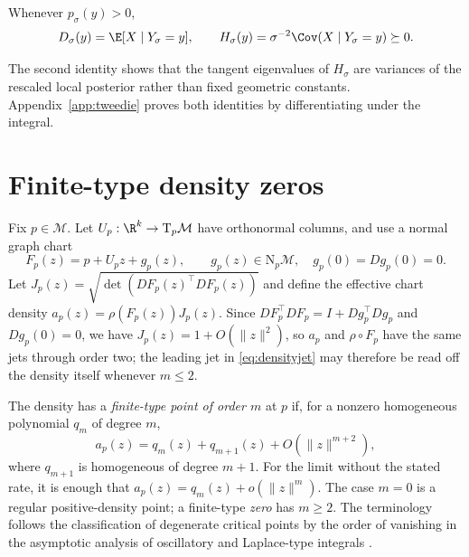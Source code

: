 \documentclass[10pt]{article}
\theoremstyle{c2fup}
\newcommand{\M}{\mathcal{M}}
\newcommand{\T}{\mathrm{T}}
\newcommand{\N}{\mathrm{N}}
\begin{document}
\begin{proposition}
\label{prop:tweedie}
Whenever $p_\sigma(y)>0$,
\begin{equation}
  D_\sigma(y)=\E[X\mid Y_\sigma=y],
  \qquad
  H_\sigma(y)=\sigma^{-2}\Cov(X\mid Y_\sigma=y)\succeq0.
  \label{eq:tweedie}
\end{equation}
\end{proposition}

The second identity shows that the tangent eigenvalues of $H_\sigma$ are variances of the rescaled local posterior rather than fixed geometric constants.  Appendix~\ref{app:tweedie} proves both identities by differentiating under the integral.

\section{Finite-type density zeros}
\label{sec:finite}

Fix $p\in\M$.  Let $U_p:\R^k\to\T_p\M$ have orthonormal columns, and use a normal graph chart
\begin{equation}
  F_p(z)=p+U_pz+g_p(z),\qquad g_p(z)\in\N_p\M,\quad
  g_p(0)=Dg_p(0)=0.
  \label{eq:chart}
\end{equation}
Let $J_p(z)=\sqrt{\det(DF_p(z)^\top DF_p(z))}$ and define the effective chart density $a_p(z)=\rho(F_p(z))J_p(z)$.  Since $DF_p^\top DF_p=I+Dg_p^\top Dg_p$ and $Dg_p(0)=0$, we have $J_p(z)=1+O(\|z\|^2)$, so $a_p$ and $\rho\circ F_p$ have the same jets through order two; the leading jet in \eqref{eq:densityjet} may therefore be read off the density itself whenever $m\le2$.

\begin{definition}
\label{def:finite}
The density has a \emph{finite-type point of order $m$} at $p$ if, for a nonzero homogeneous polynomial $q_m$ of degree $m$,
\begin{equation}
  a_p(z)=q_m(z)+q_{m+1}(z)+O(\|z\|^{m+2}),
  \label{eq:densityjet}
\end{equation}
where $q_{m+1}$ is homogeneous of degree $m+1$.  For the limit without the stated rate, it is enough that $a_p(z)=q_m(z)+o(\|z\|^m)$.
The case $m=0$ is a regular positive-density point; a finite-type \emph{zero} has $m\ge2$.  The terminology follows the classification of degenerate critical points by the order of vanishing in the asymptotic analysis of oscillatory and Laplace-type integrals \citep{varchenko1976newton}.
\end{definition}
\end{document}
